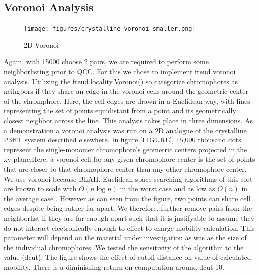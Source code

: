 \subsection{Voronoi Analysis}

\begin{figure}
  \center
  \texttt{[image: figures/crystalline\_voronoi\_smaller.png]} 
  \caption{2D Voronoi}
  \label{fig:2d}
\end{figure}


Again, with 15000 choose 2 pairs, we are required to perform some neighborlisting prior to QCC. For this we chose to
implement freud voronoi analysis. Utilizing the freud.locality.Voronoi() so categorize chromophores as
neihgbors if they share an edge in the voronoi cells around the geometric center of the chromphore. Here, the
cell edges are drawn in a Euclidean way, with lines representing the set of points equidistant from a point
and its geometrically closest neighbor across the line. This analysis takes place in three dimensions. As a
demonstration a voronoi analysis was run on a 2D analogue of the crystalline P3HT system described elsewhere.
In figure [FIGURE], 15,000 thousand dots represent the single-monomer chromophore's geometric centers projected
in the xy-plane.Here,
a voronoi cell for any given chromophore center is the set of points that are closer to that chromophore
center than any other chromophore center. We use voronoi because BLAH. Euclidean space searching algorithms of
this sort are known to scale with $O(n\log{n})$ in the worst case and as low as $O(n)$ in the average case
\cite{Bentley1980}.
However as can seen from the figure, two points can share cell edges despite being rather far apart. We
therefore, further remove pairs from the neighborlist if they are far enough apart such that it is justifyable
to assume they do not interact electronically enough to effect to charge mobility calculation. This parameter will
depend on the material under investigation as was as the size of the individual chromophores. We tested the
sensitivity of the algorithm to the value (dcut). The figure shows the effect of cutoff distance on value of
calculated mobility. There is a diminishing return on computation around dcut 10. 


